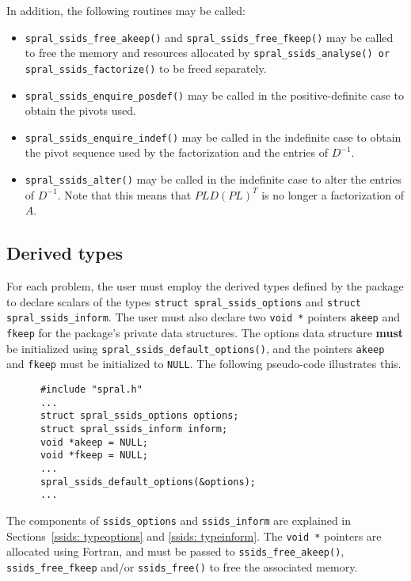 \noindent
In addition, the following routines may be called:
\begin{itemize}
\item {\tt spral\_ssids\_free\_akeep()} and {\tt spral\_ssids\_free\_fkeep()}
may be called to free the memory and resources allocated by 
{\tt spral\_ssids\_analyse() or spral\_ssids\_factorize()} to be freed
separately.
\item {\tt spral\_ssids\_enquire\_posdef()} may be called
in the  positive-definite case to obtain the pivots used.
\item {\tt spral\_ssids\_enquire\_indef()} may be called
in the indefinite case to obtain the pivot sequence used by the factorization
and the entries of  ${D}^{-1}$.
\item {\tt spral\_ssids\_alter()} may be called in the indefinite case to alter
the entries of ${D}^{-1}$.
Note that this means that  $PLD(PL)^T$ is no longer
a factorization of $A$.

\end{itemize}


\subsection{Derived types} \label{ssids: derived types}

For each problem, the user must employ the derived types defined by the
package to declare scalars of the types {\tt struct spral\_ssids\_options} and
{\tt struct spral\_ssids\_inform}. The user must also declare two
\texttt{void~*} pointers \texttt{akeep} and \texttt{fkeep} for the package's
private data structures. The options data structure \textbf{must} be initialized
using \texttt{spral\_ssids\_default\_options()}, and the pointers \texttt{akeep}
and \texttt{fkeep} must be initialized to \texttt{NULL}.
The following pseudo-code illustrates this.
\begin{verbatim}
      #include "spral.h"
      ...
      struct spral_ssids_options options;
      struct spral_ssids_inform inform;
      void *akeep = NULL;
      void *fkeep = NULL;
      ...
      spral_ssids_default_options(&options);
      ...
\end{verbatim}
The components of {\tt ssids\_options} and {\tt ssids\_inform} are explained
in Sections~\ref{ssids: typeoptions} and \ref{ssids: typeinform}.
The \texttt{void~*} pointers are allocated using Fortran, and must be passed to
\texttt{ssids\_free\_akeep()}, \texttt{ssids\_free\_fkeep} and/or
\texttt{ssids\_free()} to free the associated memory.

